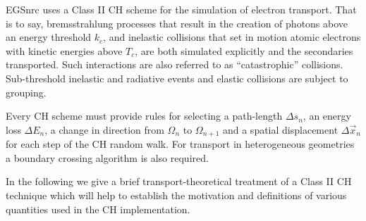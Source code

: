 EGSnrc uses a Class II CH scheme 
for the simulation of electron transport. 
That is to say, bremsstrahlung processes that result in the 
creation of photons above an energy threshold $k_c$, and 
inelastic collisions that set in motion atomic electrons with 
kinetic energies above $T_c$, are both simulated explicitly and the
secondaries transported. Such interactions are also referred to as 
``catastrophic'' collisions. 
Sub-threshold inelastic and radiative events and 
elastic collisions are subject to grouping. 

Every CH scheme must provide rules for selecting
a path-length $\Delta s_n$, an energy loss $\Delta E_n$, 
a change in direction from
$\Omega_n$ to $\Omega_{n+1}$ and a spatial displacement
$\Delta \vec{x}_n$ for each step of the CH random walk. For transport in 
heterogeneous geometries a boundary crossing algorithm is 
also required.

In the following we give a brief transport-theoretical 
treatment of a Class II CH technique which will help 
to establish the motivation and definitions of 
various quantities used in the CH implementation.

